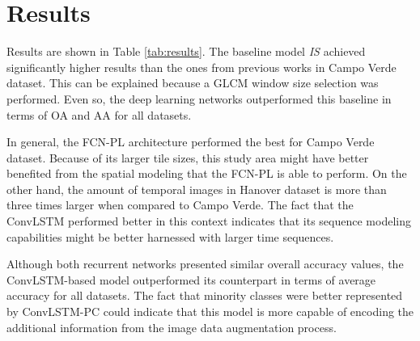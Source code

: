 
\section{Results}



Results are shown in Table \ref{tab:results}. The baseline model \textit{IS} achieved significantly higher results than the ones from previous works in Campo Verde dataset. This can be explained because a GLCM window size selection was performed. Even so, the deep learning networks outperformed this baseline in terms of OA and AA for all datasets. 

In general, the FCN-PL architecture performed the best for Campo Verde dataset. Because of its larger tile sizes, this study area might have better benefited from the spatial modeling that the FCN-PL is able to perform. On the other hand, the amount of temporal images in Hanover dataset is more than three times larger when compared to Campo Verde. The fact that the ConvLSTM performed better in this context indicates that its sequence modeling capabilities might be better harnessed with larger time sequences.

Although both recurrent networks presented similar overall accuracy values, the ConvLSTM-based model outperformed its counterpart in terms of average accuracy for all datasets. The fact that minority classes were better represented by ConvLSTM-PC could indicate that this model is more capable of encoding the additional information from the image data augmentation process.   \vspace{0.5cm}


